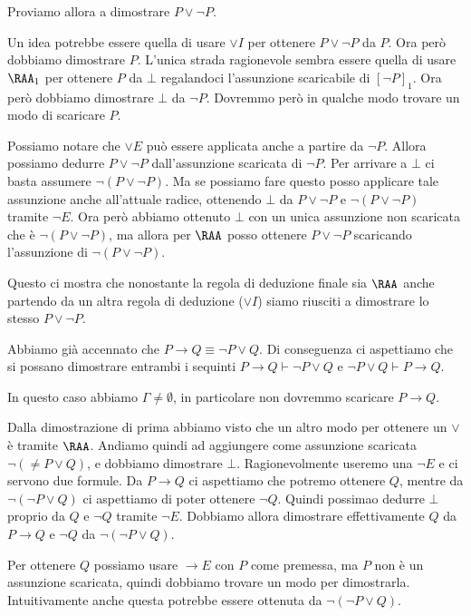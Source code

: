 Proviamo allora a dimostrare \(P \lor \neg P\).

Un idea potrebbe essere quella di usare \(\lor I\) per ottenere \(P \lor \neg P\) da \(P\). Ora però dobbiamo dimostrare \(P\).
L'unica strada ragionevole sembra essere quella di usare \({\RAA}_1\) per ottenere \(P\) da \(\bot\) regalandoci l'assunzione scaricabile di \({[\neg P]}_1\). Ora però dobbiamo dimostrare \(\bot\) da \(\neg P\). Dovremmo però in qualche modo trovare un modo di scaricare \(P\).

Possiamo notare che \(\lor E\) può essere applicata anche a partire da \(\neg P\). Allora possiamo dedurre \(P \lor \neg P\) dall'assunzione scaricata di \(\neg P\). Per arrivare a \(\bot\) ci basta assumere \(\neg (P\lor \neg P)\). Ma se possiamo fare questo posso applicare tale assunzione anche all'attuale radice, ottenendo \(\bot\) da \(P \lor \neg P\) e \(\neg (P\lor \neg P)\) tramite \(\neg E\). Ora però abbiamo ottenuto \(\bot\) con un unica assunzione non scaricata che è \(\neg (P\lor \neg P)\), ma allora per \(\RAA\) posso ottenere \(P \lor \neg P\) scaricando l'assunzione di \(\neg (P\lor \neg P)\).

Questo ci mostra che nonostante la regola di deduzione finale sia \(\RAA\) anche partendo da un altra regola di deduzione (\(\lor I\)) siamo riusciti a dimostrare lo stesso \(P \lor \neg P\).

Abbiamo già accennato che \(P\to Q \equiv \neg P \lor Q\). Di conseguenza ci aspettiamo che si possano dimostrare entrambi i sequinti \(P\to Q \vdash \neg P \lor Q\) e \(\neg P \lor Q \vdash P\to Q\).

In questo caso abbiamo \(\Gamma \neq \emptyset\), in particolare non dovremmo scaricare \(P\to Q\).

Dalla dimostrazione di prima abbiamo visto che un altro modo per ottenere un \(\lor\) è tramite \(\RAA\).
Andiamo quindi ad aggiungere come assunzione scaricata \(\neg(\neq P \lor Q)\), e dobbiamo dimostrare \(\bot\).
Ragionevolmente useremo una \(\neg E\) e ci servono due formule. Da \(P \to Q\) ci aspettiamo che potremo ottenere \(Q\), mentre da \(\neg(\neg P \lor Q)\) ci aspettiamo di poter ottenere \(\neg Q\). Quindi possimao dedurre \(\bot\) proprio da \(Q\) e \(\neg Q\) tramite \(\neg E\). Dobbiamo allora dimostrare effettivamente \(Q\) da \(P \to Q\) e \(\neg Q\) da \(\neg(\neg P \lor Q)\).

Per ottenere \(Q\) possiamo usare \(\to E\) con \(P\) come premessa, ma \(P\) non è un assunzione scaricata, quindi dobbiamo trovare un modo per dimostrarla. Intuitivamente anche questa potrebbe essere ottenuta da \(\neg (\neg P \lor Q)\).


